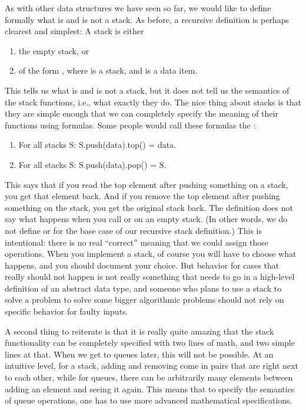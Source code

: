 As with other data structures we have seen so far,
we would like to define formally what is and is not a stack.
As before, a recursive definition is perhaps clearest and simplest:
A stack is either
\begin{enumerate}
\item the empty stack, or
\item of the form , where  is a stack, and
   is a data item.
\end{enumerate}

This tells us what is and is not a stack, but it does not tell us the
semantics of the stack functions, i.e., what exactly they do. 
The nice thing about stacks is that they are simple enough that we
can completely specify the meaning of their functions using formulas.
Some people would call these formulas the :

\begin{enumerate}
\item For all stacks S: S.push(data).top() = data.
\item For all stacks S: S.push(data).pop() = S.
\end{enumerate}

This says that if you read the top element after pushing something on
a stack, you get that element back.
And if you remove the top element after pushing something on the stack,
you get the original stack back.
The definition does not say what happens when you call  or
 on an empty stack.
(In other words, we do not define  or  for the
base case of our recursive stack definition.)
This is intentional: there is no real ``correct'' meaning that we
could assign those operations.
When you implement a stack, of course you will have to choose what happens,
and you should document your choice. 
But behavior for cases that really should not happen is not really
something that needs to go in a high-level definition of an abstract
data type, and someone who plans to use a stack to solve a problem to
solve some bigger algorithmic problems should not rely on specific
behavior for faulty inputs.

A second thing to reiterate is that it is really quite amazing that
the stack functionality can be completely specified with two lines of
math, and two simple lines at that.
When we get to queues later, this will not be possible.
At an intuitive level, for a stack, adding and removing come in pairs
that are right next to each other, while for queues, there can be
arbitrarily many elements between adding an element and seeing it again.
This means that to specify the semantics of queue operations,
one has to use more advanced mathematical specifications.

